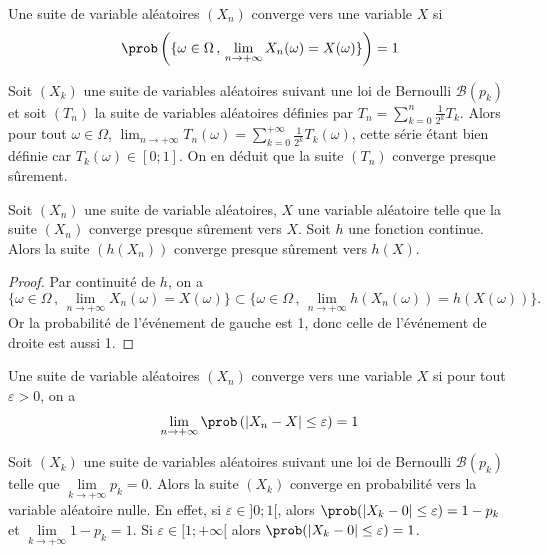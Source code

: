 		\begin{definition}{}{}
			Une suite de variable aléatoires $(X_n)$ converge  vers une variable $X$ si 
			$$\prob\left(\{\omega \in \Omega \, , \, \lim_{n \to +\infty} X_n(\omega) = X(\omega)\} \right) = 1$$
		\end{definition}
	
	\begin{exemple}{}{}
Soit $(X_k)$ une suite de variables aléatoires suivant une loi de Bernoulli $\mathcal{B}(p_k)$ et soit $(T_n)$ la suite de variables aléatoires définies par $T_n=\sum_{k=0}^n \frac{1}{2^k}T_k$. Alors pour tout $\omega \in \Omega$, $\lim_{n \to +\infty}T_n(\omega) = \sum_{k=0}^{+\infty} \frac{1}{2^k}T_k(\omega)$, cette série étant bien définie car $T_k(\omega) \in [0;1]$. On en déduit que la suite $(T_n)$ converge presque sûrement.
\end{exemple}

\begin{proposition}{}{}
	Soit $(X_n)$ une suite de variable aléatoires, $X$ une variable aléatoire telle que la suite $(X_n)$ converge presque sûrement vers $X$. Soit $h$ une fonction continue. Alors la suite $(h(X_n))$ converge presque sûrement vers $h(X)$.
\end{proposition}
\begin{proof}
	Par continuité de $h$, on a $$\{\omega \in \Omega \, , \, \lim_{n \to +\infty} X_n(\omega) = X(\omega)\} \subset \{\omega \in \Omega \, , \, \lim_{n \to +\infty} h(X_n(\omega)) = h(X(\omega))\}.$$ Or la probabilité de l'événement de gauche est 1, donc celle de l'événement de droite est aussi 1.
\end{proof}


\begin{definition}{}{}
	Une suite de variable aléatoires $(X_n)$ converge  vers une variable $X$ si pour tout $\varepsilon >0$, on a 
	$$\lim_{n \to +\infty} \prob\left(|X_n-X| \leq \varepsilon \right) = 1$$
\end{definition}

\begin{exemple}{}{}
Soit $(X_k)$ une suite de variables aléatoires suivant une loi de Bernoulli $\mathcal{B}(p_k)$ telle que $\lim\limits_{k \to +\infty} p_k = 0$. Alors la suite $(X_k)$ converge en probabilité vers la variable aléatoire nulle. En effet, si $\varepsilon \in ]0;1[$, alors $\prob(|X_k-0| \leq \varepsilon) = 1-p_k$ et $\lim\limits_{k \to +\infty} 1-p_k = 1$. Si $\varepsilon \in [1;+\infty[$ alors  $\prob(|X_k-0| \leq \varepsilon) = 1$.
\end{exemple}

